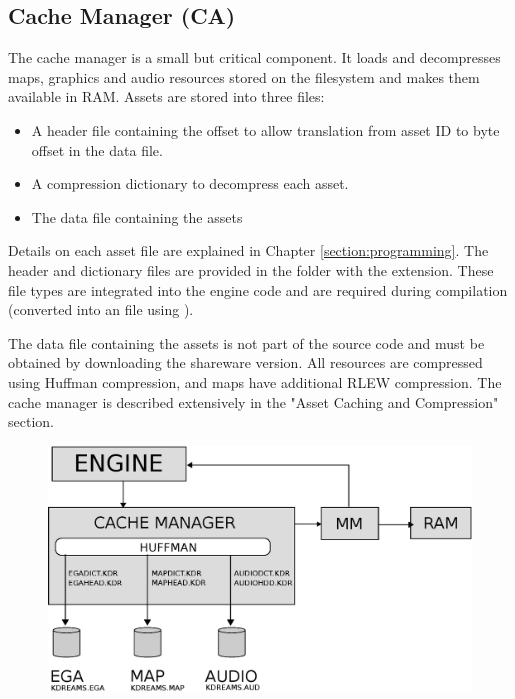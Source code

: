 \documentclass[book.tex]{subfiles}
\begin{document}
\subsection{Cache Manager (CA)}
The cache manager is a small but critical component. It loads and decompresses maps, graphics and audio resources stored on the filesystem and makes them available in RAM. Assets are stored into three files: 
\begin{itemize}
	\item A header file containing the offset to allow translation from asset ID to byte offset in the data file.
	\item A compression dictionary to decompress each asset.
	\item The data file containing the assets
\end{itemize}

\par
Details on each asset file are explained in Chapter \ref{section:programming}. The header and dictionary files are provided in the  folder with the  extension. These file types are integrated into the engine code and are required during compilation (converted into an  file using ). \\

\par
The data file containing the assets is not part of the source code and must be obtained by downloading the shareware version. All resources are compressed using Huffman compression, and maps have additional RLEW compression. The cache manager is described extensively in the "Asset Caching and Compression" section.\\

 \par
\begin{figure}[H]
\centering
 \includegraphics[width=\textwidth]{imgs/drawings/cache_manager_architecture.eps}
 \end{figure}
\end{document}
